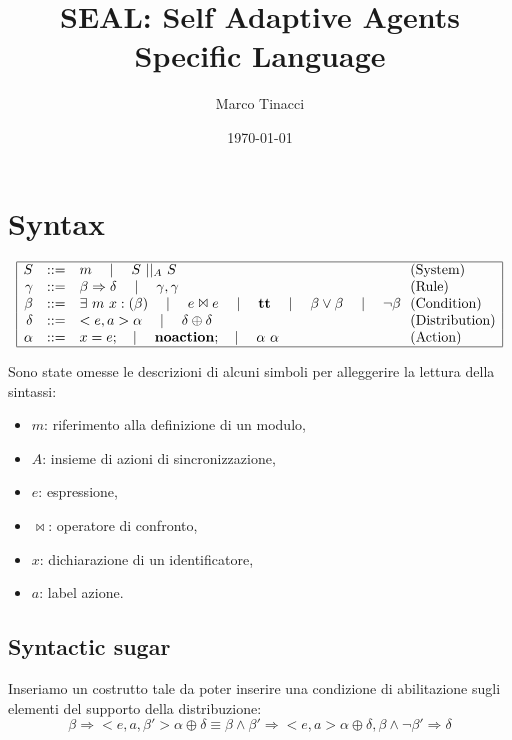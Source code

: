 \documentclass{article}
\title{SEAL: Self Adaptive Agents Specific Language}
\author{Marco Tinacci}
\date{\today}
\newcommand{\Sep}{\quad\mid\quad}
\newcommand{\Space}{\mbox{ }}
\newcommand{\Par}{\Space||_A\Space}
\begin{document}
\maketitle
\tableofcontents
\section{Syntax}

$$
\begin{array}{|rcl@{\ \ }l|}
\hline
S &::=& m \Sep S \Par S & \mbox{(System)} \\
\gamma &::=& \beta \Rightarrow \delta \Sep \gamma,\gamma & \mbox{(Rule)} \\
\beta &::=& \exists \Space m \Space x: (\beta) \Sep e \Join e \Sep \mathbf{tt} \Sep \beta \vee \beta \Sep \neg\beta & \mbox{(Condition)} \\
\delta &::=& <e,a> \alpha \Sep \delta \oplus \delta & \mbox{(Distribution)} \\
\alpha &::=& x = e; \Sep \mathbf{no action}; \Sep \alpha \Space \alpha & \mbox{(Action)} \\
\hline
\end{array}
$$

Sono state omesse le descrizioni di alcuni simboli per alleggerire la lettura della sintassi:
\begin{itemize}
	\item $m$: riferimento alla definizione di un modulo,
	\item $A$: insieme di azioni di sincronizzazione,
	\item $e$: espressione,
	\item $\Join$: operatore di confronto,
	\item $x$: dichiarazione di un identificatore,
	\item $a$: label azione.
\end{itemize}

\subsection{Syntactic sugar}
Inseriamo un costrutto tale da poter inserire una condizione di abilitazione sugli elementi del supporto della distribuzione:
$$
\beta \Rightarrow <e,a,\beta'> \alpha \oplus \delta
\equiv 
\beta \wedge \beta' \Rightarrow <e,a> \alpha \oplus \delta,
\beta \wedge \neg\beta' \Rightarrow \delta
$$
\end{document}

